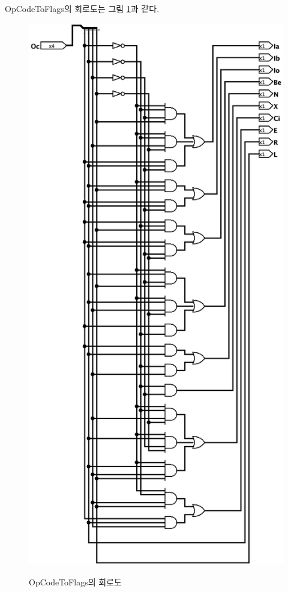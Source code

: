 \documentclass{article}
\renewcommand{\figurename}{그림}
\begin{document}
OpCodeToFlags의 회로도는 \figurename{} \ref{fig:octf}과 같다.

\begin{figure}[p]
    \centering
    \includegraphics[scale=0.35]{OpCodeToFlags} \\
    \caption{OpCodeToFlags의 회로도}
    \label{fig:octf}
\end{figure}
\end{document}

